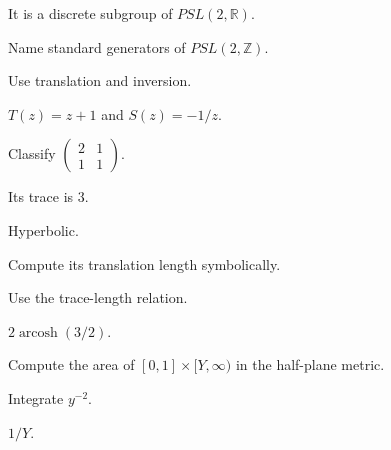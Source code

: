 \begin{solution}
It is a discrete subgroup of \(PSL(2,\mathbb R)\).
\end{solution}

\begin{exercise}\label{exr:vii35-ped-02}
Name standard generators of \(PSL(2,\mathbb Z)\).
\end{exercise}

\begin{hint}
Use translation and inversion.
\end{hint}

\begin{solution}
\(T(z)=z+1\) and \(S(z)=-1/z\).
\end{solution}

\begin{exercise}\label{exr:vii35-ped-03}
Classify \(\begin{pmatrix}2&1\\1&1\end{pmatrix}\).
\end{exercise}

\begin{hint}
Its trace is \(3\).
\end{hint}

\begin{solution}
Hyperbolic.
\end{solution}

\begin{exercise}\label{exr:vii35-ped-04}
Compute its translation length symbolically.
\end{exercise}

\begin{hint}
Use the trace-length relation.
\end{hint}

\begin{solution}
\(2\operatorname{arcosh}(3/2)\).
\end{solution}

\begin{exercise}\label{exr:vii35-ped-05}
Compute the area of \([0,1]\times[Y,\infty)\) in the half-plane metric.
\end{exercise}

\begin{hint}
Integrate \(y^{-2}\).
\end{hint}

\begin{solution}
\(1/Y\).
\end{solution}

